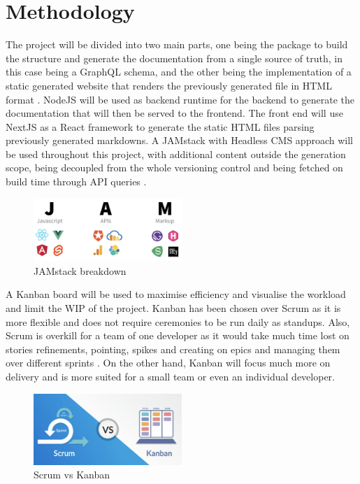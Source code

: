 \section*{Methodology}
\label{s:Methodology}
The project will be divided into two main parts, one being the package to build
the structure and generate the documentation from a single source of truth, in
this case being a GraphQL schema, and the other being the implementation of a
static generated website that renders the previously generated file in HTML
format \citep{gagliardiDjangoRESTMeets2021}. NodeJS will be used as backend
runtime for the backend to generate the documentation that will then be served
to the frontend. The front end will use NextJS as a React framework to generate
the static HTML files parsing previously generated markdowns. A JAMstack with
Headless CMS approach will be used throughout this project, with additional
content outside the generation scope, being decoupled from the whole versioning
control and being fetched on build time through API queries
\citep{zammettiWhatJAMstackAll2020}.
\begin{figure}[H]
  \centering
  \includegraphics[width=0.5\textwidth]{figures/jackstack}
  \caption{JAMstack breakdown \citep{freecodecampWhatJAMstackHow2020}}
  \label{f:jackstack}
\end{figure}
A Kanban board will be used to maximise efficiency and visualise the workload
and limit the WIP of the project. Kanban has been chosen over Scrum as it is
more flexible and does not require ceremonies to be run daily as standups. Also,
Scrum is overkill for a team of one developer as it would take much time lost on
stories refinements, pointing, spikes and creating on epics and managing them
over different sprints \citep{zayatFrameworkStudyAgile2020}. On the other hand,
Kanban will focus much more on delivery and is more suited for a small team or
even an individual developer.
\begin{figure}[ht]
  \centering
  \includegraphics[width=0.5\textwidth]{figures/agile}
  \caption{Scrum vs Kanban \citep{theagilehelpScrumVsKanban2020}}
  \label{f:agile}
\end{figure}
